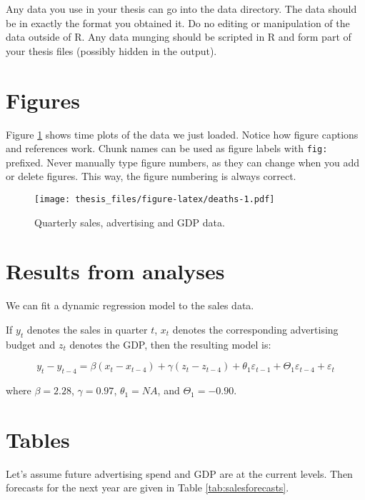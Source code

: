 \documentclass{monashthesis}
\begin{document}
Any data you use in your thesis can go into the data directory. The data
should be in exactly the format you obtained it. Do no editing or
manipulation of the data outside of R. Any data munging should be
scripted in R and form part of your thesis files (possibly hidden in the
output).

\section{Figures}\label{figures}

Figure \ref{fig:deaths} shows time plots of the data we just loaded.
Notice how figure captions and references work. Chunk names can be used
as figure labels with \texttt{fig:} prefixed. Never manually type figure
numbers, as they can change when you add or delete figures. This way,
the figure numbering is always correct.

\begin{figure}
\centering
\texttt{[image: thesis\_files/figure-latex/deaths-1.pdf]}
\caption{\label{fig:deaths}Quarterly sales, advertising and GDP data.}
\end{figure}

\section{Results from analyses}\label{results-from-analyses}

We can fit a dynamic regression model to the sales data.

If \(y_t\) denotes the sales in quarter \(t\), \(x_t\) denotes the
corresponding advertising budget and \(z_t\) denotes the GDP, then the
resulting model is:

\begin{equation}
  y_t - y_{t-4} = \beta (x_t-x_{t-4}) + \gamma (z_t-z_{t-4}) + \theta_1 \varepsilon_{t-1} + \Theta_1 \varepsilon_{t-4} + \varepsilon_t
\end{equation}

where \(\beta = 2.28\), \(\gamma = 0.97\), \(\theta_1 = NA\), and
\(\Theta_1 = -0.90\).

\section{Tables}\label{tables}

Let's assume future advertising spend and GDP are at the current levels.
Then forecasts for the next year are given in Table
\ref{tab:salesforecasts}.
\end{document}
